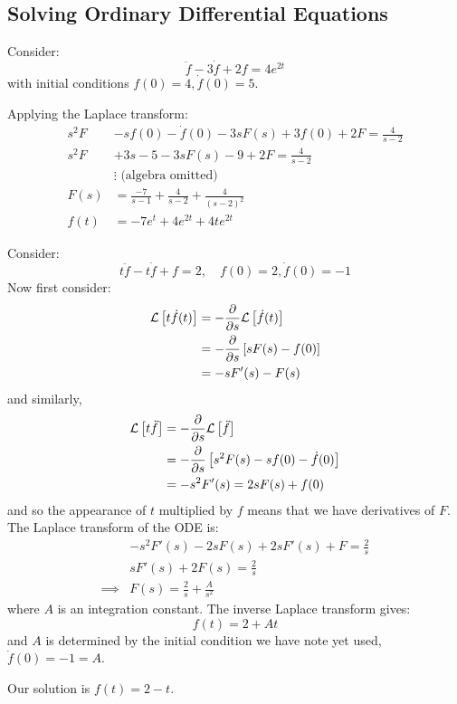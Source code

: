 \documentclass[../Main.tex]{subfiles}
\begin{document}
\subsection{Solving Ordinary Differential Equations}
\begin{example}
    Consider:
    \begin{equation*}
        \ddot{f} - 3\dot{f} + 2f = 4e^{2t}
    \end{equation*}
    with initial conditions $f(0) = 4, \dot{f}(0) = 5$.

    Applying the Laplace transform:
    \begin{align*}
        s^2 F &- sf(0) - \dot{f}(0) - 3sF(s) + 3f(0) + 2F = \frac{4}{s-2} \\
        s^2 F &+3s - 5 - 3sF(s) - 9 + 2F = \frac{4}{s-2} \\
        &\vdots \text{ (algebra omitted)} \\
        F(s) &= \frac{-7}{s - 1} + \frac{4}{s - 2} + \frac{4}{(s - 2)^2} \\
        f(t) &= -7e^t + 4e^{2t} + 4te^{2t}
    \end{align*}
\end{example}
\begin{example}
    Consider:
    \begin{equation*}
        t\ddot{f} - t\dot{f} + f = 2,\quad f(0) = 2, \dot{f}(0) = -1
    \end{equation*}
    Now first consider:
    \begin{align*}
        \mathcal{L}\left[t \dot{f}(t)\right] &= -\frac{\partial}{\partial s} \mathcal{L}\left[\dot{f}(t)\right] \\
        &= -\frac{\partial}{\partial s} \left[sF(s) - f(0)\right] \\
        &= -sF'(s) - F(s)
    \end{align*}
    and similarly,
    \begin{align*}
        \mathcal{L}\left[t\ddot{f}\right] &= -\frac{\partial}{\partial s} \mathcal{L}\left[\ddot{f}\right] \\
        &= -\frac{\partial}{\partial s} \left[s^2 F(s) - sf(0) - \dot{f}(0)\right] \\
        &= -s^2 F'(s) = 2sF(s) + f(0)
    \end{align*}
    and so the appearance of $t$ multiplied by $f$ means that we have derivatives of $F$. The Laplace transform of the ODE is:
    \begin{align*}
        &-s^2 F'(s) - 2sF(s) + 2sF'(s) + F = \frac{2}{s} \\
        &sF'(s) + 2F(s) = \frac2s \\
        \implies& F(s) = \frac{2}{s} + \frac{A}{s^2}
    \end{align*}
    where $A$ is an integration constant. The inverse Laplace transform gives:
    \begin{equation*}
        f(t) = 2 + At
    \end{equation*}
    and $A$ is determined by the initial condition we have note yet used, $\dot{f}(0) = -1 = A$.
    
    Our solution is $f(t) = 2-t$.
\end{example}
\end{document}
